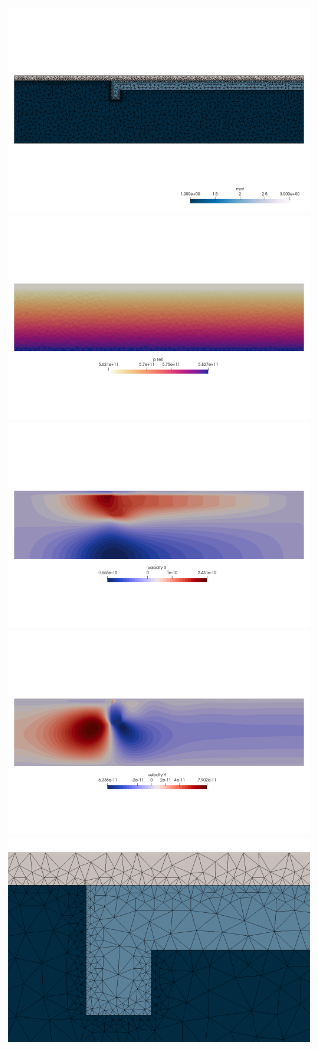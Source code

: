 \begin{center}
\includegraphics[width=8cm]{python_codes/fieldstone_93/results_exp6/mesh1}
\includegraphics[width=8cm]{python_codes/fieldstone_93/results_exp6/press}\\
\includegraphics[width=8cm]{python_codes/fieldstone_93/results_exp6/u}
\includegraphics[width=8cm]{python_codes/fieldstone_93/results_exp6/v}\\
\includegraphics[width=8cm]{python_codes/fieldstone_93/results_exp6/mesh2}

\end{center}
